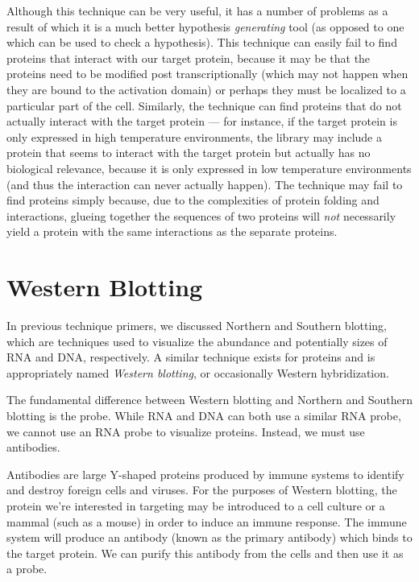 \documentclass{article}
\begin{document}
Although this technique can be very useful, it has a number of problems as a result of which it is a
much better hypothesis \emph{generating} tool (as opposed to one which can be used to check a
hypothesis). This technique can easily fail to find proteins that interact with our target protein,
because it may be that the proteins need to be modified post transcriptionally (which may not happen
when they are bound to the activation domain) or perhaps they must be localized to a particular part
of the cell. Similarly, the technique can find proteins that do not actually interact with the
target protein --- for instance, if the target protein is only expressed in high temperature
environments, the library may include a protein that seems to interact with the target protein but
actually has no biological relevance, because it is only expressed in low temperature environments
(and thus the interaction can never actually happen). The technique may fail to find proteins simply
because, due to the complexities of protein folding and interactions, glueing together the sequences
of two proteins will \emph{not} necessarily yield a protein with the same interactions as the
separate proteins.

\section*{Western Blotting}

In previous technique primers, we discussed Northern and Southern blotting, which are techniques
used to visualize the abundance and potentially sizes of RNA and DNA, respectively. A similar
technique exists for proteins and is appropriately named \emph{Western blotting}, or occasionally
Western hybridization.

The fundamental difference between Western blotting and Northern and Southern blotting is the probe.
While RNA and DNA can both use a similar RNA probe, we cannot use an RNA probe to visualize
proteins. Instead, we must use antibodies. 

Antibodies are large Y-shaped proteins produced by immune systems to identify and destroy foreign
cells and viruses. For the purposes of Western blotting, the protein we're interested in targeting
may be introduced to a cell culture or a mammal (such as a mouse) in order to induce an immune
response. The immune system will produce an antibody (known as the primary antibody) which binds to
the target protein. We can purify this antibody from the cells and then use it as a probe.
\end{document}
